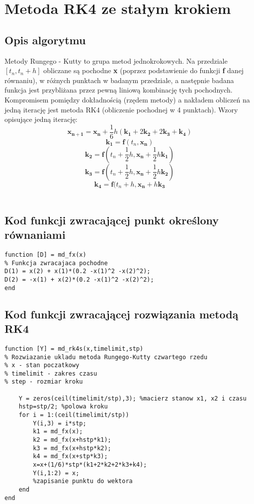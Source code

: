\documentclass[a4paper, 11pt]{article}
\begin{document}
\section{Metoda RK4 ze stałym krokiem}

\subsection{Opis algorytmu}
Metody Rungego - Kutty to grupa metod jednokrokowych. Na przedziale $[t_{n}, t_{n} + h]$ obliczane są pochodne \textbf{x} (poprzez podstawienie do funkcji \textbf{f} danej równaniu), w różnych punktach w badanym przedziale, a następnie badana funkcja jest przybliżana przez pewną liniową kombinację tych pochodnych. Kompromisem pomiędzy dokładnością (rzędem metody) a nakładem obliczeń na jedną iterację jest metoda RK4 (obliczenie pochodnej w 4 punktach). Wzory opisujące jedną iterację:
$$ \mathbf{x_{n+1}} = \mathbf{x_{n}} + \frac{1}{6}h(\mathbf{k_{1}} + 2\mathbf{k_{2}} + 2\mathbf{k_{3}} + \mathbf{k_{4}})$$
$$\mathbf{k_{1}} = \mathbf{f}(t_{n}, \mathbf{x_{n}})$$
$$\mathbf{k_{2}} = \mathbf{f}(t_{n}+\frac{1}{2}h, \mathbf{x_{n}} + \frac{1}{2}h\mathbf{k_{1}})$$
$$\mathbf{k_{3}} = \mathbf{f}(t_{n}+\frac{1}{2}h, \mathbf{x_{n}} + \frac{1}{2}h\mathbf{k_{2}})$$
$$\mathbf{k_{4}} = \mathbf{f}(t_{n}+h, \mathbf{x_{n}} + h\mathbf{k_{3}}$$\\



\subsection{Kod funkcji zwracającej punkt określony równaniami}
\begin{lstlisting}
function [D] = md_fx(x)
% Funkcja zwracajaca pochodne  
D(1) = x(2) + x(1)*(0.2 -x(1)^2 -x(2)^2); 
D(2) = -x(1) + x(2)*(0.2 -x(1)^2 -x(2)^2);
end
\end{lstlisting}
\hspace{5cm}
\subsection{Kod funkcji zwracającej rozwiązania metodą RK4}
\begin{lstlisting}
function [Y] = md_rk4s(x,timelimit,stp)
% Rozwiazanie ukladu metoda Rungego-Kutty czwartego rzedu
% x - stan poczatkowy
% timelimit - zakres czasu
% step - rozmiar kroku

    Y = zeros(ceil(timelimit/stp),3); %macierz stanow x1, x2 i czasu
    hstp=stp/2; %polowa kroku
    for i = 1:(ceil(timelimit/stp))
        Y(i,3) = i*stp;  
        k1 = md_fx(x); 
        k2 = md_fx(x+hstp*k1); 
        k3 = md_fx(x+hstp*k2); 
        k4 = md_fx(x+stp*k3); 
        x=x+(1/6)*stp*(k1+2*k2+2*k3+k4); 
        Y(i,1:2) = x;  
        %zapisanie punktu do wektora
    end
end
\end{lstlisting}
\end{document}
